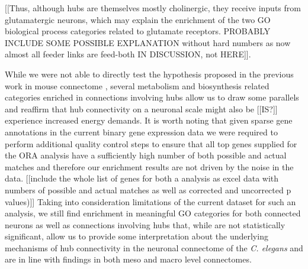 \documentclass[10pt,letterpaper]{article}
\begin{document}

[[Thus, although hubs are themselves mostly cholinergic, they receive inputs from glutamatergic neurons, which may explain the enrichment of the two GO biological process categories related to glutamate receptors.
PROBABLY INCLUDE SOME POSSIBLE EXPLANATION without hard numbers as now almost all feeder links are feed-both IN DISCUSSION, not HERE]]. 

While we were not able to directly test the hypothesis proposed in the previous work in mouse connectome \cite{Fulcher2016}, several metabolism and biosynthesis related categories enriched in connections involving hubs allow us to draw some parallels and reaffirm that hub connectivity on a neuronal scale might also be [[IS?]] experience increased energy demands.
It is worth noting that given sparse gene annotations in the current binary gene expression data we were required to perform additional quality control steps to ensure that all top genes supplied for the ORA analysis have a sufficiently high number of both possible and actual matches and therefore our enrichment results are not driven by the noise in the data. [[include the whole list of genes for both a analysis as excel data with numbers of possible and actual matches as well as corrected and uncorrected p values)]]
Taking into consideration limitations of the current dataset for such an analysis, we still find enrichment in meaningful GO categories for both connected neurons as well as connections involving hubs that, while are not statistically significant, allow us to provide some interpretation about the underlying mechanisms of hub connectivity in the neuronal connectome of the \textit{C. elegans} and are in line with findings in both meso and macro level connectomes. 

\end{document}
